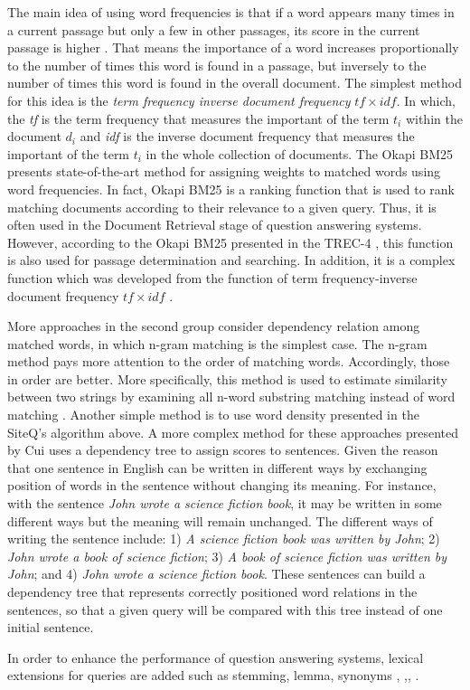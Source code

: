 The main idea of using word frequencies is that if a word appears many times in a current passage but only a few in other passages, its score in the current passage is higher \cite{robertson2004uid}. That means the importance of a word increases proportionally to the number of times this word is found in a passage, but inversely to the number of times this word is found in the overall document. The simplest method for this idea is the \textit{term frequency inverse document frequency} \textit{\ensuremath{tf\times idf}}. In which, the \textit{tf} is the term frequency that measures the important of the term \textit{\ensuremath{t_{i}}} within the document \textit{\ensuremath{d_{i}}} and \textit{idf} is the inverse document frequency that measures the important of the term \textit{\ensuremath{t_{i}}} in the whole collection of documents. The Okapi BM25 \cite{robertson1996ot, beaulieu1995ot, xue2008rmq, comas2008sdr, tellex2003qep} presents state-of-the-art method for assigning weights to matched words using word frequencies. In fact, Okapi BM25 is a ranking function that is used to rank matching documents according to their relevance to a given query. Thus, it is often used in the Document Retrieval stage of question answering systems. However, according to the Okapi BM25 presented in the TREC-4 \cite{robertson1996ot}, this function is also used for passage determination and searching. In addition, it is a complex function which was developed from the function of term frequency-inverse document frequency \textit{\ensuremath{tf\times idf}} \cite{robertson2004uid}. 

More approaches in the second group consider dependency relation among matched words, in which n-gram matching is the simplest case. The n-gram method pays more attention to the order of matching words. Accordingly, those in order are better. More specifically, this method is used to estimate similarity between two strings by examining all n-word substring matching instead of word matching \cite{robertson1998ang}. Another simple method is to use word density presented in the SiteQ's algorithm above. A more complex method for these approaches presented by Cui \cite{cui2005qap} uses a dependency tree to assign scores to sentences. Given the reason that one sentence in English can be written in different ways by exchanging position of words in the sentence without changing its meaning. For instance, with the sentence \textit{John wrote a science fiction book}, it may be written in some different ways but the meaning will remain unchanged. The different ways of writing the sentence include: 1)  \textit{A science fiction book was written by John}; 2) \textit{John wrote a book of science fiction}; 3) \textit{A book of science fiction was written by John}; and 4) \textit{John wrote a science fiction book}. These sentences can build a dependency tree that represents correctly positioned word relations in the sentences, so that a given query will be compared with this tree instead of one initial sentence.
 
In order to enhance the performance of question answering systems, lexical extensions for queries are added such as stemming, lemma, synonyms \cite{light2002aec}, \cite{tellex2003pmf},\cite{bilotti2004wbq}, \cite{lee2002seh}.
